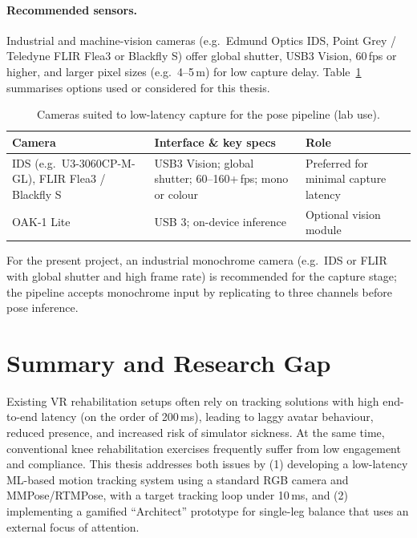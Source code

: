 \paragraph{Recommended sensors.}
Industrial and machine-vision cameras (e.g.\ Edmund Optics IDS, Point Grey / Teledyne FLIR Flea3 or Blackfly S) offer global shutter, USB3 Vision, 60\,fps or higher, and larger pixel sizes (e.g.\ 4--5\,\textmu m) for low capture delay. Table~\ref{tab:camera-options} summarises options used or considered for this thesis.

\begin{table}[htbp]
\centering
\caption{Cameras suited to low-latency capture for the pose pipeline (lab use).}
\label{tab:camera-options}
\small
\begin{tabularx}{\textwidth}{@{}p{2.8cm}Xp{2.2cm}@{}}
\toprule
Camera & Interface \& key specs & Role \\
\midrule
IDS (e.g.\ U3-3060CP-M-GL), FLIR Flea3 / Blackfly S & USB3 Vision; global shutter; 60--160+\,fps; mono or colour & Preferred for minimal capture latency \\
OAK-1 Lite & USB 3; on-device inference & Optional vision module \\
\bottomrule
\end{tabularx}
\end{table}

For the present project, an industrial monochrome camera (e.g.\ IDS or FLIR with global shutter and high frame rate) is recommended for the capture stage; the pipeline accepts monochrome input by replicating to three channels before pose inference.

\section{Summary and Research Gap}

Existing VR rehabilitation setups often rely on tracking solutions with high end-to-end latency (on the order of 200\,ms), leading to laggy avatar behaviour, reduced presence, and increased risk of simulator sickness. At the same time, conventional knee rehabilitation exercises frequently suffer from low engagement and compliance. This thesis addresses both issues by (1) developing a low-latency ML-based motion tracking system using a standard RGB camera and MMPose/RTMPose, with a target tracking loop under 10\,ms, and (2) implementing a gamified ``Architect'' prototype for single-leg balance that uses an external focus of attention.

